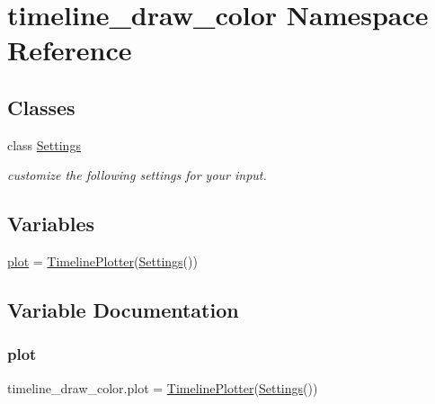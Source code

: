 \hypertarget{namespacetimeline__draw__color}{}\section{timeline\+\_\+draw\+\_\+color Namespace Reference}
\label{namespacetimeline__draw__color}
\subsection*{Classes}
\begin{DoxyCompactItemize}
\item 
class \hyperlink{classtimeline__draw__color_1_1Settings}{Settings}
\begin{DoxyCompactList}\small\item\em customize the following settings for your input. \end{DoxyCompactList}\end{DoxyCompactItemize}
\subsection*{Variables}
\begin{DoxyCompactItemize}
\item 
\hyperlink{namespacetimeline__draw__color_a50d6f326d544b606d8303db0fdbc98f7}{plot} = \hyperlink{classtimeline__plotter_1_1TimelinePlotter}{Timeline\+Plotter}(\hyperlink{classtimeline__draw__color_1_1Settings}{Settings}())
\end{DoxyCompactItemize}


\subsection{Variable Documentation}
\mbox{\label{namespacetimeline__draw__color_a50d6f326d544b606d8303db0fdbc98f7}} 
\subsubsection{\texorpdfstring{plot}{plot}}
{\footnotesize\ttfamily timeline\+\_\+draw\+\_\+color.\+plot = \hyperlink{classtimeline__plotter_1_1TimelinePlotter}{Timeline\+Plotter}(\hyperlink{classtimeline__draw__color_1_1Settings}{Settings}())}

